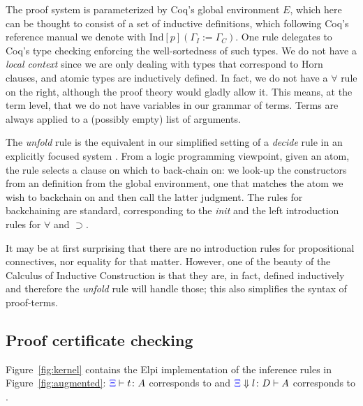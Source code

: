 The proof system is parameterized by Coq's global environment $E$, which
here can be thought to consist of a set of inductive definitions,
which following Coq's reference manual we denote with
$\mathrm{Ind}[p]  (\Gamma_I := \Gamma_C)$.  One  rule delegates
to Coq's type checking enforcing the well-sortedness of such types. We
do not have a \emph{local context} since we are only dealing with types
that correspond to Horn clauses, and atomic types are inductively
defined. In fact, we do not have a $\forall$ rule on the right,
although the proof theory would gladly allow it. This means, at the
term level, that we do not have variables in our grammar of
terms. Terms are always applied to a (possibly empty) list of
arguments.

The \emph{unfold} rule is the equivalent in our simplified setting of
a \emph{decide} rule in an explicitly focused system
\cite{liang09tcs}.  From a logic programming viewpoint, given an atom,
the rule selects a clause on which to back-chain on: we look-up the
constructors from an  definition from the global
environment, one that matches the atom we wish to backchain on and then
call the latter judgment. The rules for backchaining are standard,
corresponding to the \emph{init} and the left introduction rules for
$\forall$ and $\supset$.

It may be at first surprising that there are no
introduction rules for propositional connectives, nor equality for
that matter. However, one of the beauty of the Calculus of Inductive
Construction is that they are, in fact,  defined inductively and
therefore the \emph{unfold} rule will handle those; this also
simplifies the syntax of proof-terms.

\subsection{Proof certificate checking}

Figure~\ref{fig:kernel} contains the Elpi implementation of the
inference rules in Figure~\ref{fig:augmented}: ${\color{blue}{\Xi}}\vdash t \colon A$ corresponds to
 and ${\color{blue}{\Xi}} \Downarrow  l \colon D\vdash A$ corresponds to
.


